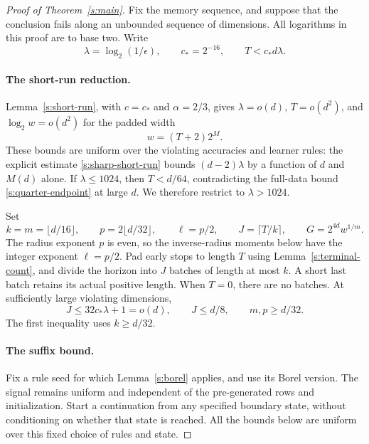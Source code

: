 \begin{proof}[Proof of Theorem~\ref{s:main}]
Fix the memory sequence, and suppose that the conclusion fails along
an unbounded sequence of dimensions. All logarithms in this proof
are to base two. Write
\begin{equation}\label{s:numeric-contradiction}
 \lambda=\log_2(1/\epsilon),\qquad
 c_*=2^{-16},\qquad T<c_*d\lambda.
\end{equation}

\paragraph{The short-run reduction.}
Lemma~\ref{s:short-run}, with \(c=c_*\) and \(\alpha=2/3\), gives
\(\lambda=o(d)\), \(T=o(d^2)\), and
\(\log_2w=o(d^2)\) for the padded width
\[
 w=(T+2)2^M.
\]
These bounds are uniform over the violating accuracies and learner
rules: the explicit estimate \eqref{s:sharp-short-run} bounds
\((d-2)\lambda\) by a function of \(d\) and \(M(d)\) alone.
If \(\lambda\le1024\), then \(T<d/64\), contradicting the
full-data bound \eqref{s:quarter-endpoint} at large \(d\).
We therefore restrict to \(\lambda>1024\).

Set
\begin{equation}\label{s:numeric-parameters}
 k=m=\lfloor d/16\rfloor,\qquad
 p=2\lfloor d/32\rfloor,\qquad
 \ell=p/2,\qquad
 J=\lceil T/k\rceil,\qquad
 G=2^{4d}w^{1/m}.
\end{equation}
The radius exponent \(p\) is even, so the inverse-radius moments
below have the integer exponent \(\ell=p/2\).
Pad early stops to length \(T\) using
Lemma~\ref{s:terminal-count}, and divide the horizon into \(J\)
batches of length at most \(k\). A short last batch retains its actual
positive length. When \(T=0\), there are no batches. At sufficiently
large violating dimensions,
\begin{equation}\label{s:numeric-budget}
 J\le32c_*\lambda+1=o(d),\qquad
 J\le d/8,\qquad m,p\ge d/32.
\end{equation}
The first inequality uses \(k\ge d/32\).

\paragraph{The suffix bound.}
Fix a rule seed for which Lemma~\ref{s:borel} applies, and use its
Borel version. The signal remains uniform and independent of the
pre-generated rows and initialization. Start a continuation from any
specified boundary state, without conditioning on whether that state
is reached. All the bounds below are uniform over this fixed choice
of rules and state.


\end{proof}
